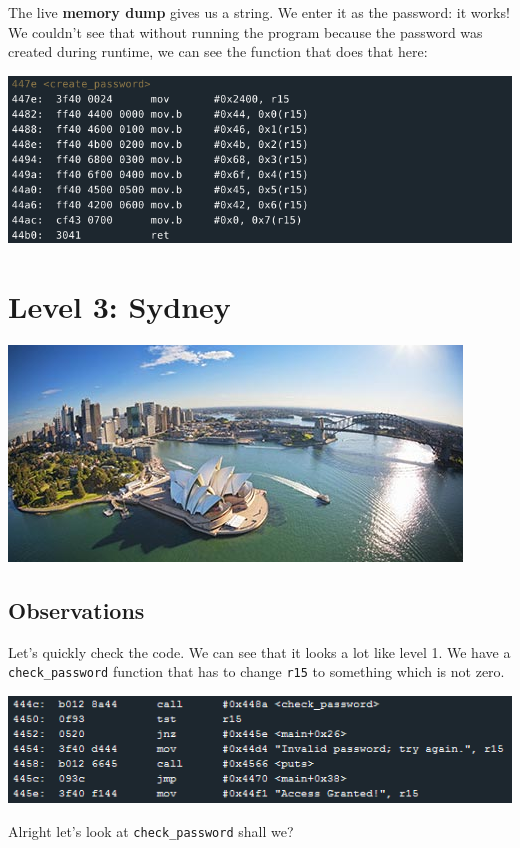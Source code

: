 \documentclass[a4paper,11pt]{article}
\begin{document}
The live \textbf{memory dump} gives us a string. We enter it as the
password: it works!\\We couldn't see that without running the program
because the password was created during runtime, we can see the function
that does that here:

\includegraphics{img/1_5.png}

\section{Level 3: Sydney}\label{level-3-sydney}

\includegraphics{img/3_2.PNG}

\subsection{Observations}\label{observations}

Let's quickly check the code. We can see that it looks a lot like level
1. We have a \texttt{check\_password} function that has to change
\texttt{r15} to something which is not zero.

\includegraphics{img/2_1.PNG}

Alright let's look at \texttt{check\_password} shall we?
\end{document}
